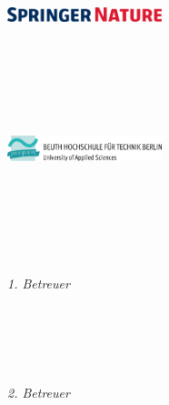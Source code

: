 \begin{titlepage}
	\vfill
	\begin{minipage}[t]{.35\textwidth}
		\raggedleft
		\includegraphics[width=4.5cm]{gfx/springernature} \\[2mm]
	\end{minipage}
	\hspace*{15pt}
	\begin{minipage}[t]{.59\textwidth}
		{\Large \thesisSecondReviewerUniversity} \\
	  	{\small \thesisSecondReviewerUniversityStreetAddress} \\[-1mm]
	  	{\small \thesisSecondReviewerUniversityPostalCode\ \thesisSecondReviewerUniversityCity} 
	\end{minipage} \\[15mm]
	\begin{minipage}[t]{.35\textwidth}
		\raggedleft
		\includegraphics[width=4.5cm]{gfx/beuth} \\[2mm]
	\end{minipage}
	\hspace*{15pt}
	\begin{minipage}[t]{.59\textwidth}
		{\Large \thesisFirstReviewerUniversity} \\
	  	{\small \thesisFirstReviewerUniversityStreetAddress} \\[-1mm]
	  	{\small \thesisFirstReviewerUniversityPostalCode\ \thesisFirstReviewerUniversityCity} 
	\end{minipage} \\[15mm]
	\begin{minipage}[t]{.35\textwidth}
		\raggedleft
		\textit{1. Betreuer}
	\end{minipage}
	\hspace*{15pt}
	\begin{minipage}[t]{.59\textwidth}
		\textbf{\thesisFirstReviewer} \\
		{\small \thesisFirstPosition\\
		\thesisFirstReviewerUniversity}
		\vskip 0.2in
	\end{minipage} \\[15mm]
	\begin{minipage}[t]{.35\textwidth}
		\raggedleft
		\textit{2. Betreuer}
	\end{minipage}
	\hspace*{15pt}
	\begin{minipage}[t]{.59\textwidth}
		\textbf{\thesisSecondReviewer} \\
		{\small \thesisSecondPosition\\
		\thesisSecondReviewerUniversity}
	\end{minipage} \\
\end{titlepage}
